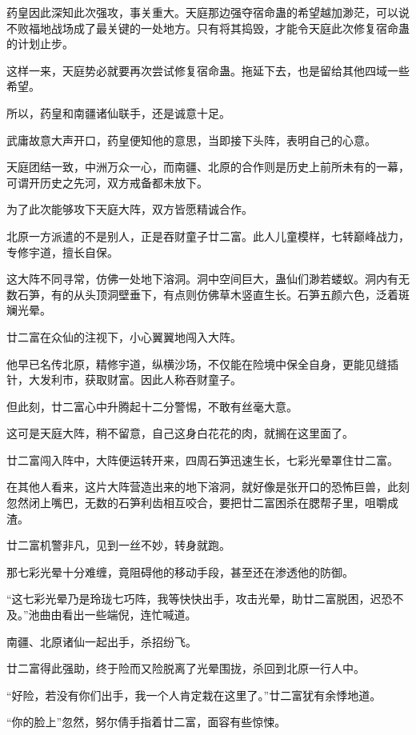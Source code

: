 \begin{this_body}
药皇因此深知此次强攻，事关重大。天庭那边强夺宿命蛊的希望越加渺茫，可以说不败福地战场成了最关键的一处地方。只有将其捣毁，才能令天庭此次修复宿命蛊的计划止步。

这样一来，天庭势必就要再次尝试修复宿命蛊。拖延下去，也是留给其他四域一些希望。

所以，药皇和南疆诸仙联手，还是诚意十足。

武庸故意大声开口，药皇便知他的意思，当即接下头阵，表明自己的心意。

天庭团结一致，中洲万众一心，而南疆、北原的合作则是历史上前所未有的一幕，可谓开历史之先河，双方戒备都未放下。

为了此次能够攻下天庭大阵，双方皆愿精诚合作。

北原一方派遣的不是别人，正是吞财童子廿二富。此人儿童模样，七转巅峰战力，专修宇道，擅长自保。

这大阵不同寻常，仿佛一处地下溶洞。洞中空间巨大，蛊仙们渺若蝼蚁。洞内有无数石笋，有的从头顶洞壁垂下，有点则仿佛草木竖直生长。石笋五颜六色，泛着斑斓光晕。

廿二富在众仙的注视下，小心翼翼地闯入大阵。

他早已名传北原，精修宇道，纵横沙场，不仅能在险境中保全自身，更能见缝插针，大发利市，获取财富。因此人称吞财童子。

但此刻，廿二富心中升腾起十二分警惕，不敢有丝毫大意。

这可是天庭大阵，稍不留意，自己这身白花花的肉，就搁在这里面了。

廿二富闯入阵中，大阵便运转开来，四周石笋迅速生长，七彩光晕罩住廿二富。

在其他人看来，这片大阵营造出来的地下溶洞，就好像是张开口的恐怖巨兽，此刻忽然闭上嘴巴，无数的石笋利齿相互咬合，要把廿二富困杀在腮帮子里，咀嚼成渣。

廿二富机警非凡，见到一丝不妙，转身就跑。

那七彩光晕十分难缠，竟阻碍他的移动手段，甚至还在渗透他的防御。

“这七彩光晕乃是玲珑七巧阵，我等快快出手，攻击光晕，助廿二富脱困，迟恐不及。”池曲由看出一些端倪，连忙喊道。

南疆、北原诸仙一起出手，杀招纷飞。

廿二富得此强助，终于险而又险脱离了光晕围拢，杀回到北原一行人中。

“好险，若没有你们出手，我一个人肯定栽在这里了。”廿二富犹有余悸地道。

“你的脸上”忽然，努尔倩手指着廿二富，面容有些惊悚。


\end{this_body}
